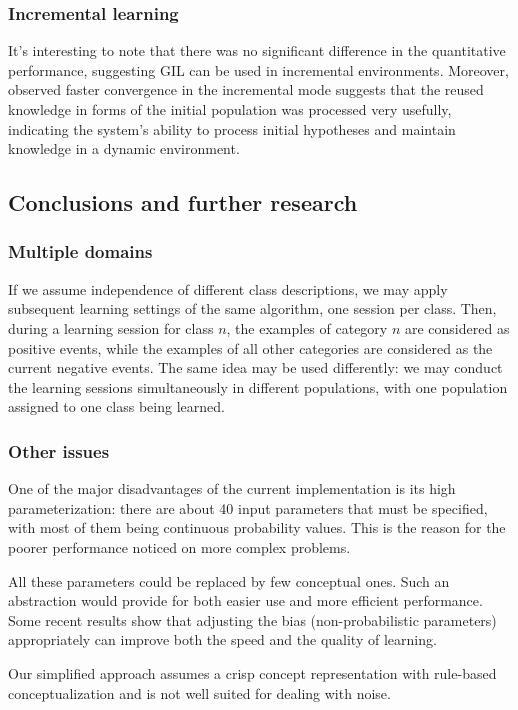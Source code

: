 \documentclass[12pt]{article}
\begin{document}
\subsubsection{Incremental learning}
It's interesting to note that there was no significant difference in the quantitative performance, suggesting GIL can be used in incremental environments. Moreover, observed faster convergence in the incremental mode suggests that the reused knowledge in forms of the initial population was processed very usefully, indicating the system's ability to process initial hypotheses and maintain knowledge in a dynamic environment.

\subsection{Conclusions and further research}
\subsubsection{Multiple domains}
If we assume independence of different class descriptions, we may apply subsequent learning settings of the same algorithm, one session per class. Then, during a learning session for class $n$, the examples of category $n$ are considered as positive events, while the examples of all other categories are considered as the current negative events. The same idea may be used differently: we may conduct the learning sessions simultaneously in different populations, with one population assigned to one class being learned.

\subsubsection{Other issues}
One of the major disadvantages of the current implementation is its high parameterization: there are about 40 input parameters that must be specified, with most of them being continuous probability values. This is the reason for the poorer performance noticed on more complex problems.

All these parameters could be replaced by few conceptual ones. Such an abstraction would provide for both easier use and more efficient performance. Some recent results show that adjusting the bias (non-probabilistic parameters) appropriately can improve both the speed and the quality of learning.

Our simplified approach assumes a crisp concept representation with rule-based conceptualization and is not well suited for dealing with noise.
\clearpage
\end{document}
